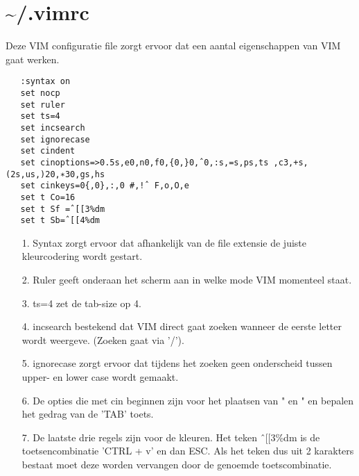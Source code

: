 \section{\~{}/.vimrc}
Deze VIM configuratie file zorgt ervoor dat een aantal eigenschappen van VIM gaat werken.
\begin{lstlisting}
   :syntax on
   set nocp
   set ruler
   set ts=4
   set incsearch
   set ignorecase
   set cindent
   set cinoptions=>0.5s,e0,n0,f0,{0,}0,ˆ0,:s,=s,ps,ts ,c3,+s,(2s,us,)20,∗30,gs,hs
   set cinkeys=0{,0},:,0 #,!ˆ F,o,O,e
   set t Co=16
   set t Sf =ˆ[[3%dm
   set t Sb=ˆ[[4%dm
\end{lstlisting}
\begin{itemize}
  \item[1.] Syntax zorgt ervoor dat afhankelijk van de file extensie de juiste kleurcodering wordt gestart.
  \item[2.] Ruler geeft onderaan het scherm aan in welke mode VIM momenteel staat.
  \item[3.] ts=4 zet de tab-size op 4.
  \item[4.] incsearch bestekend dat VIM direct gaat zoeken wanneer de eerste letter wordt weergeve. (Zoeken gaat via '/').
  \item[5.] ignorecase zorgt ervoor dat tijdens het zoeken geen onderscheid tussen upper- en lower case wordt gemaakt.
  \item[6.] De opties die met cin beginnen zijn voor het plaatsen van " en " en bepalen het gedrag van de 'TAB' toets.
  \item[7.] De laatste drie regels zijn voor de kleuren. Het teken ˆ[[3\%dm  is de toetsencombinatie 'CTRL + v' en dan ESC. Als het teken dus uit 2 karakters bestaat moet deze worden vervangen door de genoemde toetscombinatie.
\end{itemize}
